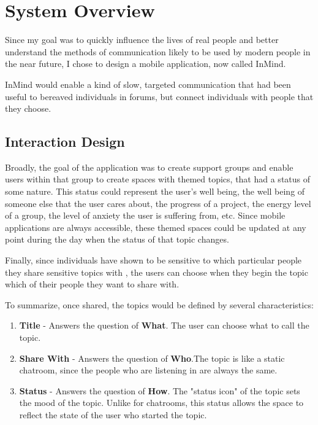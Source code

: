 \chapter{System Overview}
  Since my goal was to quickly influence the lives of real people
  and better understand the methods of communication likely to be used by
  modern people in the near future, I chose to design
  a mobile application, now called InMind.

  InMind would enable a kind of slow,
  targeted communication that had been useful to bereaved individuals in forums,
  but connect individuals with people that they choose.


  \section{Interaction Design}
  Broadly, the goal of the application was to create support groups and 
  enable users within that group to create spaces
  with themed topics, that had a status of some nature.
  This status could represent the user's well being, the well being of someone else
  that the user cares about, the progress of a project, the energy level of a group,
  the level of anxiety the user is suffering from, etc.
  Since mobile applications are always accessible,
  these themed spaces could be updated at any point
  during the day when the status of that topic changes.

  Finally, since individuals have shown to be sensitive
  to which particular people they share
  sensitive topics with \cite{patil05},
  the users can choose when they begin the topic
  which of their people they want to share with.

  To summarize, once shared, the topics would be defined by several characteristics:

  \begin{enumerate}
  \item \textbf{Title} - Answers the question of \textbf{What}. The user can choose what to call the topic.
  \item \textbf{Share With} - Answers the question of \textbf{Who}.The topic is like a static chatroom,
    since the people who are listening in are always the same.
  \item \textbf{Status} - Answers the question of \textbf{How}. The "status icon" of the topic sets the mood
    of the topic. Unlike for chatrooms,
    this status allows the space to reflect the state
    of the user who started the topic.
  \end{enumerate}

